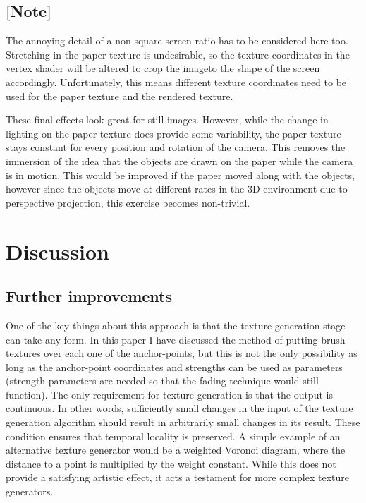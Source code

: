 \documentclass[a4paper, 12pt]{article}
\begin{document}
\subsection{[Note]}
The annoying detail of a non-square screen ratio has to be considered here too. Stretching in the paper texture is undesirable, so the texture coordinates in the vertex shader will be altered to crop the imageto the shape of the screen accordingly. Unfortunately, this means different texture coordinates need to be used for the paper texture and the rendered texture.

These final effects look great for still images. However, while the change in lighting on the paper texture does provide some variability, the paper texture stays constant for every position and rotation of the camera. This removes the immersion of the idea that the objects are drawn on the paper while the camera is in motion. This would be improved if the paper moved along with the objects, however since the objects move at different rates in the 3D environment due to perspective projection, this exercise becomes non-trivial.



\section{Discussion}

\subsection{Further improvements}

One of the key things about this approach is that the texture generation stage can take any form. In this paper I have discussed the method of putting brush textures over each one of the anchor-points, but this is not the only possibility as long as the anchor-point coordinates and strengths can be used as parameters (strength parameters are needed so that the fading technique would still function). The only requirement for texture generation is that the output is continuous. In other words, sufficiently small changes in the input of the texture generation algorithm should result in arbitrarily small changes in its result. These condition ensures that temporal locality is preserved. A simple example of an alternative texture generator would be a weighted Voronoi diagram, where the distance to a point is multiplied by the weight constant. While this does not provide a satisfying artistic effect, it acts a testament for more complex texture generators.
\end{document}

